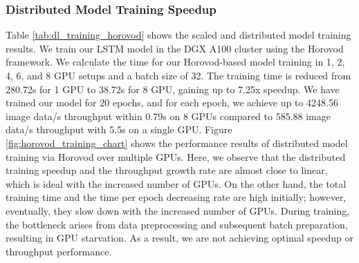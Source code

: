 \subsubsection{Distributed Model Training Speedup}
Table \ref{tab:dl_training_horovod} shows the scaled and distributed model training results. We train our LSTM model in the DGX A100 cluster using the Horovod framework. We calculate the time for our Horovod-based model training in 1, 2, 4, 6, and 8 GPU setups and a batch size of 32. The training time is reduced from 280.72s for 1 GPU to 38.72s for 8 GPU, gaining up to 7.25x speedup. We have trained our model for 20 epochs, and for each epoch, we achieve up to 4248.56 image data/s throughput within 0.79s on 8 GPUs compared to 585.88 image data/s throughput with 5.5s on a single GPU. Figure \ref{fig:horovod_training_chart} shows the performance results of distributed model training via Horovod over multiple GPUs. 
Here, we observe that the distributed training speedup and the throughput growth rate are almost close to linear, which is ideal with the increased number of GPUs.
On the other hand, the total training time and the time per epoch decreasing rate are high initially; however, eventually, they slow down with the increased number of GPUs. 
During training, the bottleneck arises from data preprocessing and subsequent batch preparation, resulting in GPU starvation. As a result, we are not achieving optimal speedup or throughput performance.

%

